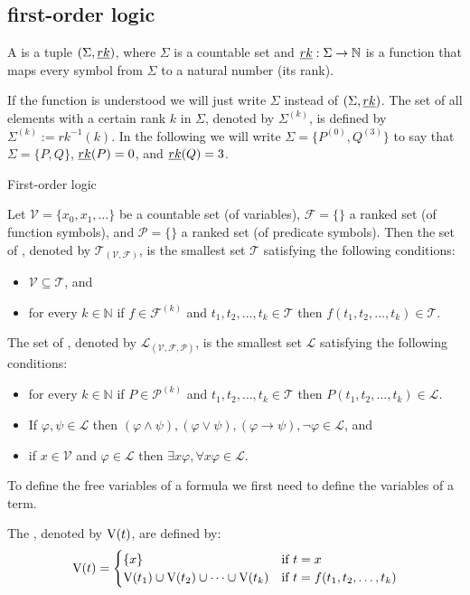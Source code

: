 \subsection{first-order logic}
\begin{definition}
A  is a tuple $(\Sigma,\emph{rk})$, where $\Sigma$ is a countable set and $\emph{rk}:\Sigma\to\mathbb{N}$ is a function that maps every symbol from $\Sigma$ to a natural number (its rank).
\end{definition}
If the function \rank{} is understood we will just write $\Sigma$ instead of $(\Sigma,\emph{rk})$. The set of all elements with a certain rank $k$ in $\Sigma$, denoted by $\Sigma^{(k)}$, is defined by $\Sigma^{(k)}:=rk^{-1}(k)$. In the following we will write $\Sigma=\{P^{(0)},Q^{(3)}\}$ to say that $\Sigma=\{P,Q\}$, $\emph{rk}(P)=0$, and $\emph{rk}(Q)=3$.

First-order logic
\begin{definition}
Let $\mathcal{V}=\{x_0,x_1,\dots\}$ be a countable set (of variables), $\mathcal{F}=\{\}$ a ranked set (of function symbols), and $\mathcal{P}=\{\}$ a ranked set (of predicate symbols). Then the set of , denoted by $\mathcal{T}_{(\mathcal{V},\mathcal{F})}$, is the smallest set $\mathcal{T}$ satisfying the following conditions:
\begin{itemize}
\item $\mathcal{V} \subseteq \mathcal{T}$, and
\item for every $k\in\mathbb{N}$ if $f\in\mathcal{F}^{(k)}$ and $t_1,t_2,\dots,t_k\in\mathcal{T}$ then $f(t_1,t_2,\dots,t_k)\in\mathcal{T}$.
\end{itemize}
The set of , denoted by $\mathcal{L}_{(\mathcal{V},\mathcal{F},\mathcal{P})}$, is the smallest set $\mathcal{L}$ satisfying the following conditions:
\begin{itemize}
\item for every $k\in\mathbb{N}$ if $P\in\mathcal{P}^{(k)}$ and $t_1,t_2,\dots,t_k\in\mathcal{T}$ then $P(t_1,t_2,\dots,t_k)\in\mathcal{L}$.
\item If $\varphi,\psi\in\mathcal{L}$ then $(\varphi\wedge\psi), (\varphi\vee\psi), (\varphi\to\psi), \neg \varphi\in\mathcal{L}$, and %
\item if $x\in\mathcal{V}$ and $\varphi\in\mathcal{L}$ then $\exists x\varphi,\forall x\varphi\in\mathcal{L}$. %
\end{itemize}
\end{definition}
To define the free variables of a formula we first need to define the variables of a term.
\begin{definition}
The , denoted by $\text{V}(t)$, are defined by:
\[\text{V}(t)=
\begin{cases}
\{x\} & \text{if $t=x$}\\
\text{V}(t_1)\cup \text{V}(t_2)\cup\dots\cup \text{V}(t_k) & \text{if $t=f(t_1,t_2,\dots,t_k)$}
\end{cases}\]
\end{definition}

